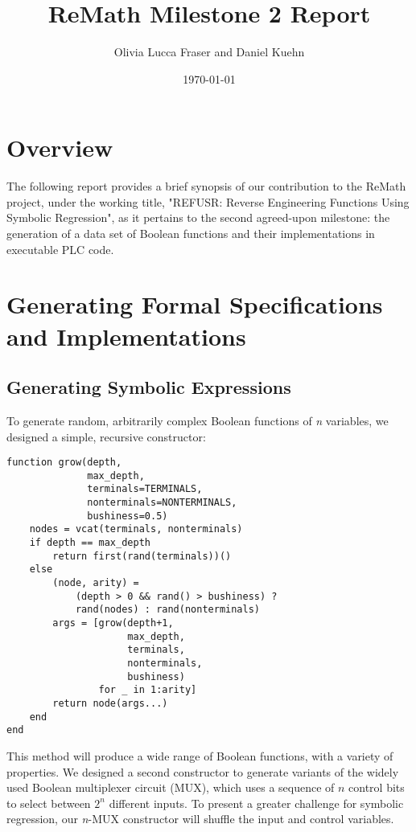\documentclass[11pt]{article}
\author{Olivia Lucca Fraser and Daniel Kuehn}
\date{\today}
\title{ReMath Milestone 2 Report}
\begin{document}
\maketitle
\tableofcontents


\section{Overview}
\label{sec:orgc09184c}

The following report provides a brief synopsis of our contribution to the ReMath project, under the working title, "REFUSR: Reverse Engineering Functions Using Symbolic Regression", as it pertains to the second agreed-upon milestone: the generation of a data set of Boolean functions and their implementations in executable PLC code. 

\section{Generating Formal Specifications and Implementations}
\label{sec:orga6d5774}
\subsection{Generating Symbolic Expressions}
\label{sec:orgb5c5d26}

To generate random, arbitrarily complex Boolean functions of \emph{n} variables, we designed a simple, recursive constructor:

\begin{verbatim}
function grow(depth,
              max_depth,
              terminals=TERMINALS,
              nonterminals=NONTERMINALS,
              bushiness=0.5)
    nodes = vcat(terminals, nonterminals)
    if depth == max_depth
        return first(rand(terminals))()
    else
        (node, arity) =
            (depth > 0 && rand() > bushiness) ?
            rand(nodes) : rand(nonterminals)
        args = [grow(depth+1,
                     max_depth,
                     terminals,
                     nonterminals,
                     bushiness)
                for _ in 1:arity]
        return node(args...)
    end
end
\end{verbatim}

This method will produce a wide range of Boolean functions, with a variety of properties. We designed a second constructor to generate variants of the widely used Boolean multiplexer circuit (MUX), which uses a sequence of \(n\) control bits to select between \(2^n\) different inputs. To present a greater challenge for symbolic regression, our \emph{n}-MUX constructor will shuffle the input and control variables.
\end{document}

